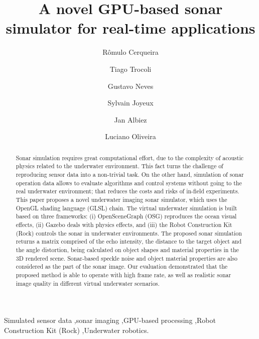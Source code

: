 \documentclass[final,5p,times]{elsarticle}
\begin{document}
\begin{frontmatter}


\title{A novel GPU-based sonar simulator for real-time applications}

\author[senai,ufba]{Rômulo Cerqueira} 
\author[senai]{Tiago Trocoli}
\author[senai]{Gustavo Neves}
\author[senai]{Sylvain Joyeux}
\author[senai,dfki]{Jan Albiez}
\author[ufba]{Luciano Oliveira}

\address[senai]{Brazilian Institute of Robotics, SENAI CIMATEC, Salvador, Bahia, Brazil}
\address[ufba]{Intelligent Vision Research Lab, Federal University of Bahia, Salvador, Bahia, Brazil}
\address[dfki]{Robotics Innovation Center, DFKI GmbH, Bremen, Germany}

\begin{abstract}

Sonar simulation requires great computational effort, due to the complexity of acoustic physics related to the underwater environment. This fact turns the challenge of reproducing sensor data into a non-trivial task. On the other hand, simulation of sonar operation data allows to evaluate algorithms and control systems without going to the real underwater environment; that reduces the costs and risks of in-field experiments. This paper proposes a novel underwater imaging sonar simulator, which uses the OpenGL shading language (GLSL) chain. The virtual underwater simulation is built based on three frameworks: (i) OpenSceneGraph (OSG) reproduces the ocean visual effects, (ii) Gazebo deals with physics effects, and (iii) the Robot Construction Kit (Rock) controls the sonar in underwater environments. The proposed sonar simulation returns a matrix comprised of the echo intensity, the distance to the target object and the angle distortion, being calculated on object shapes and material properties in the 3D rendered scene. Sonar-based speckle noise and object material properties are also considered as the part of the sonar image. Our evaluation demonstrated that the proposed method is able to operate with high frame rate, as well as realistic sonar image quality in different virtual underwater scenarios.

\end{abstract}

\begin{keyword}
Simulated sensor data \sep sonar imaging \sep GPU-based processing \sep Robot Construction Kit (Rock) \sep Underwater robotics.

\end{keyword}

\end{frontmatter}
\end{document}
